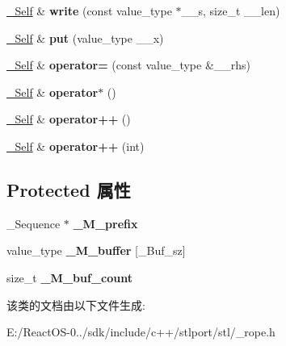 \begin{DoxyCompactItemize}
\mbox{\label{classsequence__buffer_a6f6dc01fa3739385461c396d9f89b834}} 
\hyperlink{classsequence__buffer}{\+\_\+\+Self} \& {\bfseries write} (const value\+\_\+type $\ast$\+\_\+\+\_\+s, size\+\_\+t \+\_\+\+\_\+len)
\item 
\mbox{\label{classsequence__buffer_aa992d9dcfed942845ef7b68c6bced155}} 
\hyperlink{classsequence__buffer}{\+\_\+\+Self} \& {\bfseries put} (value\+\_\+type \+\_\+\+\_\+x)
\item 
\mbox{\label{classsequence__buffer_a98177167bdc6ad1af90b8e7b70bac632}} 
\hyperlink{classsequence__buffer}{\+\_\+\+Self} \& {\bfseries operator=} (const value\+\_\+type \&\+\_\+\+\_\+rhs)
\item 
\mbox{\label{classsequence__buffer_aa7df506ceba8d42265537ce302edc998}} 
\hyperlink{classsequence__buffer}{\+\_\+\+Self} \& {\bfseries operator$\ast$} ()
\item 
\mbox{\label{classsequence__buffer_a4dc78775a7505dfab180542b6a2eb939}} 
\hyperlink{classsequence__buffer}{\+\_\+\+Self} \& {\bfseries operator++} ()
\item 
\mbox{\label{classsequence__buffer_ab87f37613b94eb3d4a6e43d68a1d743b}} 
\hyperlink{classsequence__buffer}{\+\_\+\+Self} \& {\bfseries operator++} (int)
\end{DoxyCompactItemize}
\subsection*{Protected 属性}
\begin{DoxyCompactItemize}
\item 
\mbox{\label{classsequence__buffer_a6dd439f9f3d8eb00608b7272097a85cb}} 
\+\_\+\+Sequence $\ast$ {\bfseries \+\_\+\+M\+\_\+prefix}
\item 
\mbox{\label{classsequence__buffer_a04c8da4f2f34f01787ce3aa35b1d14c6}} 
value\+\_\+type {\bfseries \+\_\+\+M\+\_\+buffer} \mbox{[}\+\_\+\+Buf\+\_\+sz\mbox{]}
\item 
\mbox{\label{classsequence__buffer_a2e8567a1ed30bd194ec99a4a2a16f855}} 
size\+\_\+t {\bfseries \+\_\+\+M\+\_\+buf\+\_\+count}
\end{DoxyCompactItemize}


该类的文档由以下文件生成\+:\begin{DoxyCompactItemize}
\item 
E\+:/\+React\+O\+S-\/0../sdk/include/c++/stlport/stl/\+\_\+rope.\+h\end{DoxyCompactItemize}
